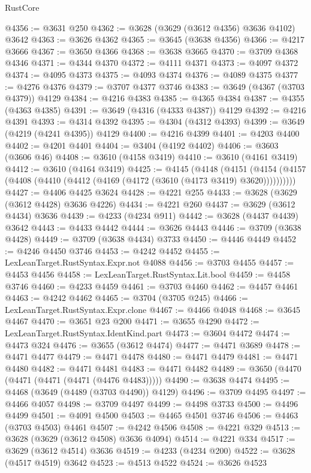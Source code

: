 \begin{lexlean}{RustCore}
\begin{coremodule}
@4356 := @3631 @250
@4362 := @3628 (@3629 (@3612 @4356) @3636 @4102) @3642
@4363 := @3626 @4362
@4365 := @3645 (@3638 @4356)
@4366 := @4217 @3666
@4367 := @3650 @4366
@4368 := @3638 @3665
@4370 := @3709 @4368 @4346
@4371 := @4344 @4370
@4372 := @4111 @4371
@4373 := @4097 @4372
@4374 := @4095 @4373
@4375 := @4093 @4374
@4376 := @4089 @4375
@4377 := @4276 @4376
@4379 := @3707 @4377 @3746
@4383 := @3649 (@4367 (@3703 @4379)) @4129
@4384 := @4216 @4383
@4385 := @4365 @4384
@4387 := @4355 (@4363 @4385)
@4391 := @3649 (@4316 (@4333 @4387)) @4129
@4392 := @4216 @4391
@4393 := @4314 @4392
@4395 := @4304 (@4312 @4393)
@4399 := @3649 (@4219 (@4241 @4395)) @4129
@4400 := @4216 @4399
@4401 := @4203 @4400
@4402 := @4201 @4401
@4404 := @3404 (@4192 @4402)
@4406 := @3603 (@3606 @46)
@4408 := @3610 (@4158 @3419)
@4410 := @3610 (@4161 @3419)
@4412 := @3610 (@4164 @3419)
@4425 := @4145
    (@4148
      (@4151 (@4154 (@4157 (@4408 (@4410 (@4412 (@4169 (@4172 (@3610 (@4173 @3419) @3620))))))))))
@4427 := @4406 @4425 @3624
@4428 := @4221 @255
@4433 := @3628 (@3629 (@3612 @4428) @3636 @4226)
@4434 := @4221 @260
@4437 := @3629 (@3612 @4434) @3636
@4439 := @4233 (@4234 @911)
@4442 := @3628 (@4437 @4439) @3642
@4443 := @4433 @4442
@4444 := @3626 @4443
@4446 := @3709 (@3638 @4428)
@4449 := @3709 (@3638 @4434) @3733
@4450 := @4446 @4449
@4452 := @4246 @4450 @3746
@4453 := @4242 @4452
@4455 := LexLeanTarget.RustSyntax.Expr.not @4088
@4456 := @3703 @4455
@4457 := @4453 @4456
@4458 := LexLeanTarget.RustSyntax.Lit.bool
@4459 := @4458 @3746
@4460 := @4233 @4459
@4461 := @3703 @4460
@4462 := @4457 @4461
@4463 := @4242 @4462
@4465 := @3704 (@3705 @245)
@4466 := LexLeanTarget.RustSyntax.Expr.clone
@4467 := @4466 @4048
@4468 := @3645 @4467
@4470 := @3651 @23 @200
@4471 := @3655 @4290
@4472 := LexLeanTarget.RustSyntax.IdentKind.part
@4473 := @3604 @4472
@4474 := @4473 @324
@4476 := @3655 (@3612 @4474)
@4477 := @4471 @3689
@4478 := @4471 @4477
@4479 := @4471 @4478
@4480 := @4471 @4479
@4481 := @4471 @4480
@4482 := @4471 @4481
@4483 := @4471 @4482
@4489 := @3650 (@4470 (@4471 (@4471 (@4471 (@4476 @4483)))))
@4490 := @3638 @4474
@4495 := @4468 (@3649 (@4489 (@3703 @4490)) @4129)
@4496 := @3709 @4495
@4497 := @4466 @4057
@4498 := @3709 @4497
@4499 := @4498 @3733
@4500 := @4496 @4499
@4501 := @4091 @4500
@4503 := @4465 @4501 @3746
@4506 := @4463 (@3703 @4503) @4461
@4507 := @4242 @4506
@4508 := @4221 @329
@4513 := @3628 (@3629 (@3612 @4508) @3636 @4094)
@4514 := @4221 @334
@4517 := @3629 (@3612 @4514) @3636
@4519 := @4233 (@4234 @200)
@4522 := @3628 (@4517 @4519) @3642
@4523 := @4513 @4522
@4524 := @3626 @4523

\end{coremodule}
\end{lexlean}
